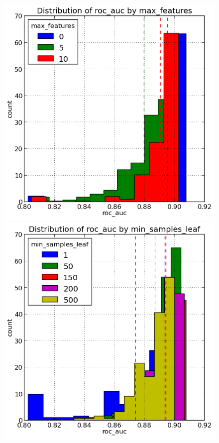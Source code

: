 \documentclass[final,3p,times,twocolumn]{elsarticle}
\begin{document}
\begin{figure}
\includegraphics[scale=0.5]{Images/roc_auc_max_features.png}
\includegraphics[scale=0.5]{Images/roc_auc_min_samples_leaf.png}

\end{figure}
\end{document}
